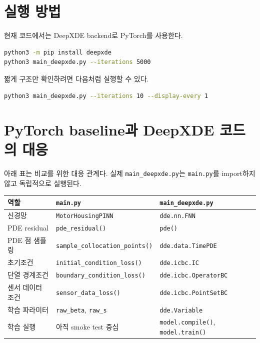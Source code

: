 \documentclass[11pt]{article}
\begin{document}
\section{실행 방법}

현재 코드에서는 DeepXDE backend로 PyTorch를 사용한다.

\begin{lstlisting}[language=bash]
python3 -m pip install deepxde
python3 main_deepxde.py --iterations 5000
\end{lstlisting}

짧게 구조만 확인하려면 다음처럼 실행할 수 있다.

\begin{lstlisting}[language=bash]
python3 main_deepxde.py --iterations 10 --display-every 1
\end{lstlisting}

\section{PyTorch baseline과 DeepXDE 코드의 대응}

아래 표는 비교를 위한 대응 관계다. 실제 \texttt{main\_deepxde.py}는 \texttt{main.py}를 import하지 않고 독립적으로 실행된다.

\begin{center}
\begin{tabular}{lll}
\toprule
역할 & \texttt{main.py} & \texttt{main\_deepxde.py} \\
\midrule
신경망 & \texttt{MotorHousingPINN} & \texttt{dde.nn.FNN} \\
PDE residual & \texttt{pde\_residual()} & \texttt{pde()} \\
PDE 점 샘플링 & \texttt{sample\_collocation\_points()} & \texttt{dde.data.TimePDE} \\
초기조건 & \texttt{initial\_condition\_loss()} & \texttt{dde.icbc.IC} \\
단열 경계조건 & \texttt{boundary\_condition\_loss()} & \texttt{dde.icbc.OperatorBC} \\
센서 데이터 조건 & \texttt{sensor\_data\_loss()} & \texttt{dde.icbc.PointSetBC} \\
학습 파라미터 & \texttt{raw\_beta}, \texttt{raw\_s} & \texttt{dde.Variable} \\
학습 실행 & 아직 smoke test 중심 & \texttt{model.compile()}, \texttt{model.train()} \\
\bottomrule
\end{tabular}
\end{center}
\end{document}
